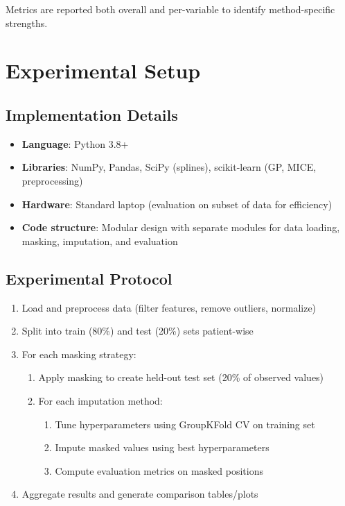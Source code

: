 \documentclass[11pt]{article}
\begin{document}
Metrics are reported both overall and per-variable to identify method-specific strengths.

\section{Experimental Setup}

\subsection{Implementation Details}
\begin{itemize}[noitemsep]
    \item \textbf{Language}: Python 3.8+
    \item \textbf{Libraries}: NumPy, Pandas, SciPy (splines), scikit-learn (GP, MICE, preprocessing)
    \item \textbf{Hardware}: Standard laptop (evaluation on subset of data for efficiency)
    \item \textbf{Code structure}: Modular design with separate modules for data loading, masking, imputation, and evaluation
\end{itemize}

\subsection{Experimental Protocol}
\begin{enumerate}[noitemsep]
    \item Load and preprocess data (filter features, remove outliers, normalize)
    \item Split into train (80\%) and test (20\%) sets patient-wise
    \item For each masking strategy:
    \begin{enumerate}[noitemsep]
        \item Apply masking to create held-out test set (20\% of observed values)
        \item For each imputation method:
        \begin{enumerate}[noitemsep]
            \item Tune hyperparameters using GroupKFold CV on training set
            \item Impute masked values using best hyperparameters
            \item Compute evaluation metrics on masked positions
        \end{enumerate}
    \end{enumerate}
    \item Aggregate results and generate comparison tables/plots
\end{enumerate}
\end{document}
